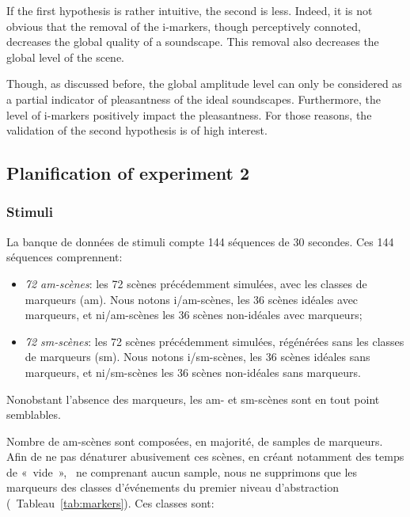 \documentclass[twoside,twocolumn]{article}
\begin{document}
If the first hypothesis is rather intuitive, the second is less. Indeed, it is not obvious that the removal of the i-markers, though perceptively connoted, decreases the global quality of a soundscape. This removal also decreases the global level of the scene.


Though, as discussed before, the global amplitude level can only be considered as a partial indicator of pleasantness of the ideal soundscapes. Furthermore, the level of i-markers positively impact the pleasantness. For those reasons, the validation of the second hypothesis is of high interest.

\subsection{Planification of experiment 2}

\subsubsection*{Stimuli}

La banque de données de stimuli compte 144 séquences de 30 secondes. Ces 144 séquences comprennent:

\begin{itemize}
\item \emph{72 am-scènes}: les 72 scènes précédemment simulées, avec les classes de marqueurs (am). Nous notons i/am-scènes, les 36 scènes idéales avec marqueurs, et ni/am-scènes les 36 scènes non-idéales avec marqueurs;
\item \emph{72 sm-scènes}: les 72 scènes précédemment simulées, régénérées sans les classes de marqueurs (sm). Nous notons i/sm-scènes, les 36 scènes idéales sans marqueurs, et ni/sm-scènes les 36 scènes non-idéales sans marqueurs.
\end{itemize}

Nonobstant l'absence des marqueurs, les am- et sm-scènes sont en tout point semblables.

Nombre de am-scènes sont composées, en majorité, de samples de marqueurs. Afin de ne pas dénaturer abusivement ces scènes, en créant notamment des temps de «~vide~», \ie~ne comprenant aucun sample, nous ne supprimons que les marqueurs des classes d'événements du premier niveau d'abstraction (\cf~Tableau~\ref{tab:markers}). Ces classes sont:
\end{document}
